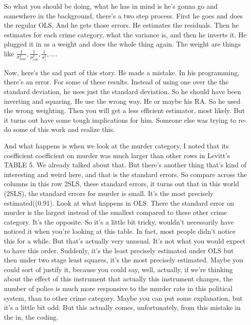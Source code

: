 \documentclass[11pt,a4paper]{amsart}
\theoremstyle{plain}
\theoremstyle{definition}
\begin{document}
				So what you should be doing, what he has in mind is he's gonna go and somewhere in the background, there's a two step process. First he goes and does the regular OLS, And he gets those errors. He estimates the residuals. Then he estimates for each crime category, what the variance is, and then he inverts it. He plugged it in as a weight and does the whole thing again. The weight are things like $\frac{1}{\sigma^{2}_{mur}}, \frac{1}{\sigma^{2}_{rob}}, \frac{1}{\sigma^{2}_{i}}, \dots$.\par 
				Now, here's the sad part of this story. He made a mistake. In his programming, there's an error. For some of these results. Instead of using one over the  the standard deviation, he uses just the standard deviation. So he should have been inverting and squaring. He use the wrong way. He or maybe his RA. So he used the wrong weighting. Then you will get a less efficient estimator, most likely. But it turns out have some tough implications for him. Someone else was trying to re-do some of this work and realize this.\par 
				And what happens is when we look at the murder category, I noted that its coefficient coefficient on murder was much larger than other rows in Levitt's TABLE 5. We already talked about that. But there's another thing that's kind of interesting and weird here, and that is the standard errors. So compare across the columns in this row 2SLS, these standard errors, it turns out that in this world (2SLS), the standard errors for  murder is small. It's the most precisely estimated((0.91). Look at what happens in OLS.  There the standard error on murder is the largest instead of the smallest compared to these other crime category. It's the opposite. So it's a little bit tricky, wouldn't necessarily have noticed it when you're looking at this table. In fact, most people didn't notice this for a while. But that's actually very unusual. It's not what you would expect to have this order. Suddenly, it's the least precisely estimated under OLS but then under two stage least squares, it's the most precisely estimated. Maybe you could sort of justify it, because you could say, well, actually, if we're thinking about the effect of this instrument that actually this instrument changes, the number of police is much more responsive to the murder rate in this political system, than to other crime category. Maybe you can put some explanation, but it's a little bit odd. But this actually comes, unfortunately, from this mistake in the in, the coding.\par 
\end{document}
